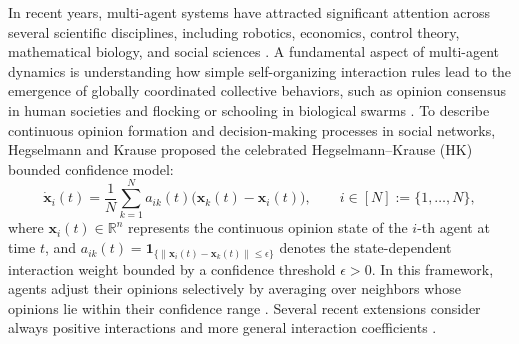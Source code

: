 \documentclass[11pt]{amsart}
\numberwithin{equation}{section}
\begin{document}
In recent years, multi-agent systems have attracted significant attention across several scientific disciplines, including robotics, economics, control theory, mathematical biology, and social sciences \cite{Bullo2009, Camazine2001, Jackson2008, Jadbabaie2003, OlfatiSaber2007}. A fundamental aspect of multi-agent dynamics is understanding how simple self-organizing interaction rules lead to the emergence of globally coordinated collective behaviors, such as opinion consensus in human societies and flocking or schooling in biological swarms \cite{Castellano2009, Vicsek1995}. To describe continuous opinion formation and decision-making processes in social networks, Hegselmann and Krause \cite{Hegselmann2002} proposed the celebrated Hegselmann--Krause (HK) bounded confidence model:
\begin{equation}\label{eq:hk_classic}
\dot{\boldsymbol{x}}_i(t) = \frac{1}{N} \sum_{k=1}^{N} a_{ik}(t)\bigl(\boldsymbol{x}_k(t) - \boldsymbol{x}_i(t)\bigr), \qquad i \in [N] := \{1, \ldots, N\},
\end{equation}
where $\boldsymbol{x}_i(t) \in \mathbb{R}^n$ represents the continuous opinion state of the $i$-th agent at time $t$, and $a_{ik}(t) = \mathbf{1}_{\{\|\boldsymbol{x}_i(t) - \boldsymbol{x}_k(t)\| \le \epsilon\}}$ denotes the state-dependent interaction weight bounded by a confidence threshold $\epsilon > 0$. In this framework, agents adjust their opinions selectively by averaging over neighbors whose opinions lie within their confidence range \cite{Canuto2012, Jabin2014}. Several  recent extensions consider always positive interactions and more general interaction coefficients \cite{Choi2021, Haskovec2021}.
\end{document}
